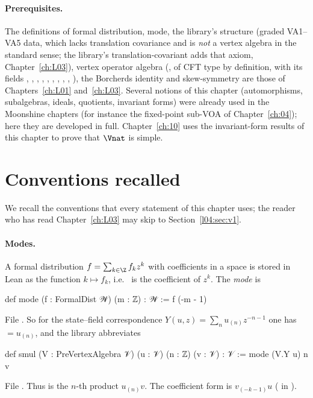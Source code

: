 \paragraph{Prerequisites.} The definitions of formal distribution, mode, the library's structure
 (graded VA1--VA5 data, which lacks translation covariance and is \emph{not} a vertex algebra in
the standard sense; the library's translation-covariant  adds that axiom, Chapter~\ref{ch:L03}), vertex
operator algebra (, of CFT type by definition, with its fields , , , ,
, , , , ,
), the Borcherds identity and skew-symmetry are those of
Chapters~\ref{ch:L01} and~\ref{ch:L03}. Several notions of this chapter (automorphisms, subalgebras, ideals,
quotients, invariant forms) were already used in the Moonshine chapters (for instance the fixed-point
sub-VOA of Chapter~\ref{ch:04}); here they are developed in full. Chapter~\ref{ch:10} uses the invariant-form
results of this chapter to prove that $\Vnat$ is simple.

\section{Conventions recalled}\label{l04:sec:conv}

We recall the conventions that every statement of this chapter uses; the reader who has read
Chapter~\ref{ch:L03} may skip to Section~\ref{l04:sec:v1}.

\paragraph{Modes.} A formal distribution $f = \sum_{k\in\Z} f_k z^k$ with coefficients in a space
is stored in Lean as the function $k\mapsto f_k$, i.e.\  is the coefficient of $z^k$.
The \emph{mode} is
\begin{leancode}
def mode (f : FormalDist 𝒲) (m : ℤ) : 𝒲 := f (-m - 1)
\end{leancode}
File . So for the state--field
correspondence $Y(u,z) = \sum_n u_{(n)}z^{-n-1}$ one has  $= u_{(n)}$, and the
library abbreviates
\begin{leancode}
def smul (V : PreVertexAlgebra 𝒱) (u : 𝒱) (n : ℤ) (v : 𝒱) : 𝒱 := mode (V.Y u) n v
\end{leancode}
File . Thus  is the
$n$-th product $u_{(n)}v$. The coefficient form  is $v_{(-k-1)}u$
( in ).

